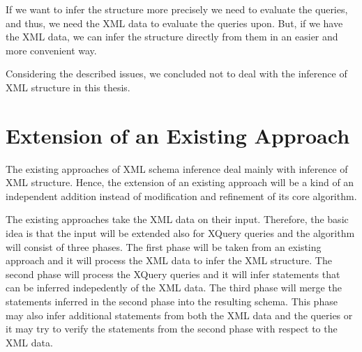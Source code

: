 
If we want to infer the structure more precisely we need to evaluate the queries, and thus, we need the XML data to evaluate the queries upon. But, if we have the XML data, we can infer the structure directly from them in an easier and more convenient way.


Considering the described issues, we concluded not to deal with the inference of XML structure in this thesis.


\section{Extension of an Existing Approach}
The existing approaches of XML schema inference deal mainly with inference of XML structure. Hence, the extension of an existing approach will be a kind of an independent addition instead of modification and refinement of its core algorithm.

The existing approaches take the XML data on their input. Therefore, the basic idea is that the input will be extended also for XQuery queries and the algorithm will consist of three phases. The first phase will be taken from an existing approach and it will process the XML data to infer the XML structure. The second phase will process the XQuery queries and it will infer statements that can be inferred indepedently of the XML data. The third phase will merge the statements inferred in the second phase into the resulting schema. This phase may also infer additional statements from both the XML data and the queries or it may try to verify the statements from the second phase with respect to the XML data.

